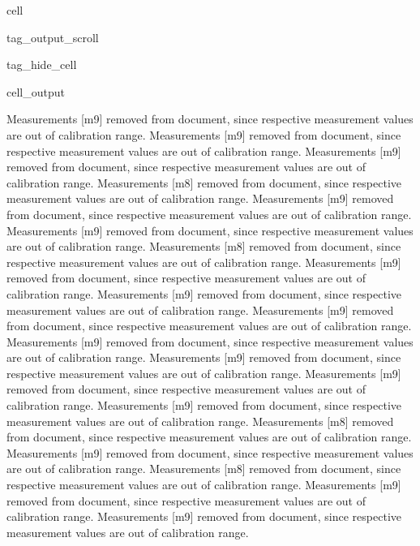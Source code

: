 \documentclass[letterpaper,12pt,english]{jupyterBook}
\begin{document}
\begin{sphinxuseclass}{cell}
\begin{sphinxuseclass}{tag_output_scroll}
\begin{sphinxuseclass}{tag_hide_cell}
\begin{sphinxVerbatimOutput}
\begin{sphinxuseclass}{cell_output}
\begin{sphinxVerbatim}[commandchars=\\\{\}]
Measurements \PYGZsq{}[\PYGZsq{}m9\PYGZsq{}]\PYGZsq{} removed from document, since respective measurement values are out of calibration range.
Measurements \PYGZsq{}[\PYGZsq{}m9\PYGZsq{}]\PYGZsq{} removed from document, since respective measurement values are out of calibration range.
Measurements \PYGZsq{}[\PYGZsq{}m9\PYGZsq{}]\PYGZsq{} removed from document, since respective measurement values are out of calibration range.
Measurements \PYGZsq{}[\PYGZsq{}m8\PYGZsq{}]\PYGZsq{} removed from document, since respective measurement values are out of calibration range.
Measurements \PYGZsq{}[\PYGZsq{}m9\PYGZsq{}]\PYGZsq{} removed from document, since respective measurement values are out of calibration range.
Measurements \PYGZsq{}[\PYGZsq{}m9\PYGZsq{}]\PYGZsq{} removed from document, since respective measurement values are out of calibration range.
Measurements \PYGZsq{}[\PYGZsq{}m8\PYGZsq{}]\PYGZsq{} removed from document, since respective measurement values are out of calibration range.
Measurements \PYGZsq{}[\PYGZsq{}m9\PYGZsq{}]\PYGZsq{} removed from document, since respective measurement values are out of calibration range.
Measurements \PYGZsq{}[\PYGZsq{}m9\PYGZsq{}]\PYGZsq{} removed from document, since respective measurement values are out of calibration range.
Measurements \PYGZsq{}[\PYGZsq{}m9\PYGZsq{}]\PYGZsq{} removed from document, since respective measurement values are out of calibration range.
Measurements \PYGZsq{}[\PYGZsq{}m9\PYGZsq{}]\PYGZsq{} removed from document, since respective measurement values are out of calibration range.
Measurements \PYGZsq{}[\PYGZsq{}m9\PYGZsq{}]\PYGZsq{} removed from document, since respective measurement values are out of calibration range.
Measurements \PYGZsq{}[\PYGZsq{}m9\PYGZsq{}]\PYGZsq{} removed from document, since respective measurement values are out of calibration range.
Measurements \PYGZsq{}[\PYGZsq{}m9\PYGZsq{}]\PYGZsq{} removed from document, since respective measurement values are out of calibration range.
Measurements \PYGZsq{}[\PYGZsq{}m8\PYGZsq{}]\PYGZsq{} removed from document, since respective measurement values are out of calibration range.
Measurements \PYGZsq{}[\PYGZsq{}m9\PYGZsq{}]\PYGZsq{} removed from document, since respective measurement values are out of calibration range.
Measurements \PYGZsq{}[\PYGZsq{}m8\PYGZsq{}]\PYGZsq{} removed from document, since respective measurement values are out of calibration range.
Measurements \PYGZsq{}[\PYGZsq{}m9\PYGZsq{}]\PYGZsq{} removed from document, since respective measurement values are out of calibration range.
Measurements \PYGZsq{}[\PYGZsq{}m9\PYGZsq{}]\PYGZsq{} removed from document, since respective measurement values are out of calibration range.
\end{sphinxVerbatim}


\end{sphinxuseclass}
\end{sphinxVerbatimOutput}
\end{sphinxuseclass}
\end{sphinxuseclass}
\end{sphinxuseclass}
\end{document}
